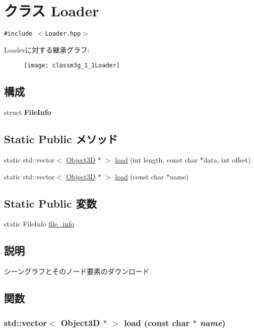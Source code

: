 \hypertarget{classm3g_1_1Loader}{
\section{クラス Loader}
\label{classm3g_1_1Loader}
}
{\tt \#include $<$Loader.hpp$>$}

Loaderに対する継承グラフ:\begin{figure}[H]
\begin{center}
\leavevmode
\texttt{[image: classm3g\_1\_1Loader]}
\end{center}
\end{figure}
\subsection*{構成}
\begin{CompactItemize}
\item 
struct \textbf{FileInfo}
\end{CompactItemize}
\subsection*{Static Public メソッド}
\begin{CompactItemize}
\item 
static std::vector$<$ \hyperlink{classm3g_1_1Object3D}{Object3D} $\ast$ $>$ \hyperlink{classm3g_1_1Loader_226696271b917ad797016959bb7adbe1}{load} (int length, const char $\ast$data, int offset)
\item 
static std::vector$<$ \hyperlink{classm3g_1_1Object3D}{Object3D} $\ast$ $>$ \hyperlink{classm3g_1_1Loader_27bd86888cdadd349223dcb303e45879}{load} (const char $\ast$name)
\end{CompactItemize}
\subsection*{Static Public 変数}
\begin{CompactItemize}
\item 
static FileInfo \hyperlink{classm3g_1_1Loader_b5b2e875f7353dca9dad61c686bccf92}{file\_\-info}
\end{CompactItemize}


\subsection{説明}
シーングラフとそのノード要素のダウンロード. 

\subsection{関数}
\hypertarget{classm3g_1_1Loader_27bd86888cdadd349223dcb303e45879}{
\subsubsection[{load}]{\setlength{\rightskip}{0pt plus 5cm}std::vector$<$ {\bf Object3D} $\ast$ $>$ load (const char $\ast$ {\em name})}}
\label{classm3g_1_1Loader_27bd86888cdadd349223dcb303e45879}


